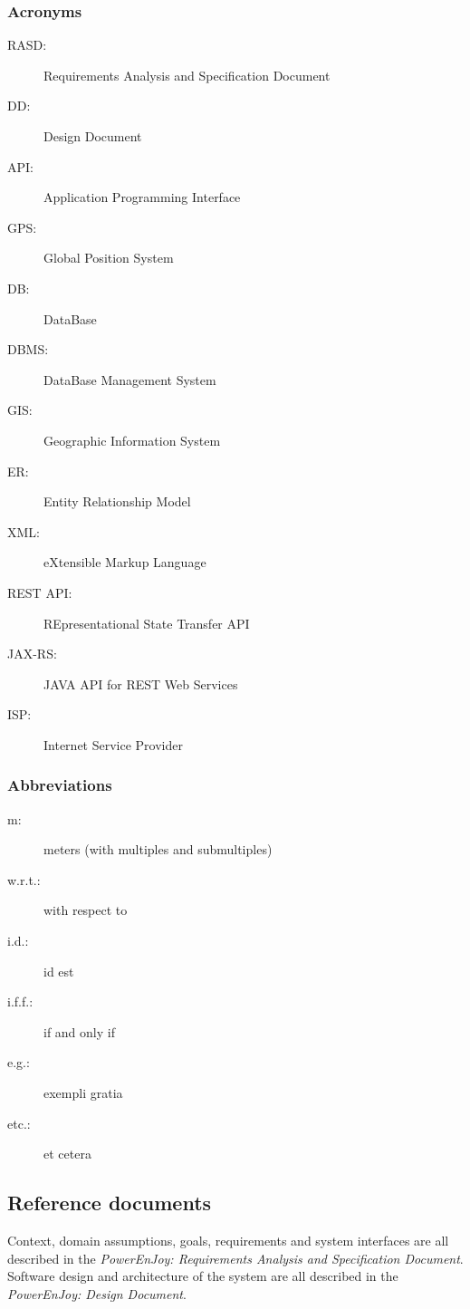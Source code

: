 \subsubsection{Acronyms}
	\begin{description}
		\item [RASD:] Requirements Analysis and Specification Document
		\item [DD:] Design Document
		\item [API:] Application Programming Interface
		\item [GPS:] Global Position System
		\item [DB:] DataBase
		\item [DBMS:] DataBase Management System
		\item [GIS:] Geographic Information System
		\item [ER:] Entity Relationship Model
		\item [XML:] eXtensible Markup Language
		\item [REST API:] REpresentational State Transfer API
		\item [JAX-RS:] JAVA API for REST Web Services
		\item [ISP:] Internet Service Provider
	\end{description}
\subsubsection{Abbreviations}
	\begin{description}
		\item [m:] meters (with multiples and submultiples)
		\item [w.r.t.:] with respect to
		\item [i.d.:] id est
		\item [i.f.f.:] if and only if
		\item [e.g.:] exempli gratia
		\item [etc.:] et cetera
	\end{description}

\subsection{Reference documents}
Context, domain assumptions, goals, requirements and system interfaces are all described in the \emph{PowerEnJoy: Requirements Analysis and Specification Document}.\cite{RASD}\\
Software design and architecture of the system are all described in the \emph{PowerEnJoy: Design Document}.\cite{DD}\\

